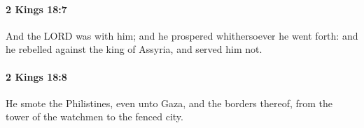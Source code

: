 		\paragraph{2 Kings 18:7} %
			\label{2KINGS-18-7}

			And the LORD was with him; and he prospered whithersoever he went forth: and he rebelled against the king of Assyria, and served him not.


		\paragraph{2 Kings 18:8} %
			\label{2KINGS-18-8}

			He smote the Philistines, even unto Gaza, and the borders thereof, from the tower of the watchmen to the fenced city.


